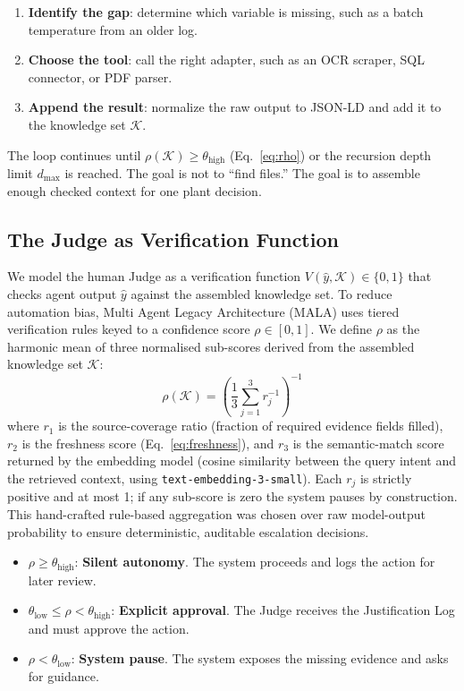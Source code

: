 \documentclass[conference]{IEEEtran}
\newcommand{\MALA}{Multi Agent Legacy Architecture (MALA)}
\begin{document}
\begin{enumerate}
  \item \textbf{Identify the gap}: determine which variable is missing, such as a batch temperature from an older log.
  \item \textbf{Choose the tool}: call the right adapter, such as an OCR scraper, SQL connector, or PDF parser.
  \item \textbf{Append the result}: normalize the raw output to JSON-LD and add it to the knowledge set $\mathcal{K}$.
\end{enumerate}

The loop continues until $\rho(\mathcal{K}) \geq \theta_{\text{high}}$ (Eq.~\ref{eq:rho}) or the recursion depth limit $d_{\max}$ is reached. The goal is not to ``find files.'' The goal is to assemble enough checked context for one plant decision.


\subsection{The Judge as Verification Function}\label{sec:judge}

We model the human Judge as a verification function $V(\hat{y}, \mathcal{K}) \in \{0, 1\}$ that checks agent output $\hat{y}$ against the assembled knowledge set. To reduce automation bias, \MALA{} uses tiered verification rules keyed to a confidence score $\rho \in [0,1]$. We define $\rho$ as the harmonic mean of three normalised sub-scores derived from the assembled knowledge set $\mathcal{K}$:
\begin{equation}
  \rho(\mathcal{K}) = {\left(\frac{1}{3}\sum_{j=1}^{3} r_j^{-1}\right)}^{-1}
  \label{eq:rho}
\end{equation}
where $r_1$ is the source-coverage ratio (fraction of required evidence fields filled), $r_2$ is the freshness score (Eq.~\ref{eq:freshness}), and $r_3$ is the semantic-match score returned by the embedding model (cosine similarity between the query intent and the retrieved context, using \texttt{text-embedding-3-small}). Each $r_j$ is strictly positive and at most 1; if any sub-score is zero the system pauses by construction. This hand-crafted rule-based aggregation was chosen over raw model-output probability to ensure deterministic, auditable escalation decisions.

\begin{itemize}
  \item $\rho \geq \theta_{\text{high}}$: \textbf{Silent autonomy}. The system proceeds and logs the action for later review.
  \item $\theta_{\text{low}} \leq \rho < \theta_{\text{high}}$: \textbf{Explicit approval}. The Judge receives the Justification Log and must approve the action.
  \item $\rho < \theta_{\text{low}}$: \textbf{System pause}. The system exposes the missing evidence and asks for guidance.
\end{itemize}
\end{document}

